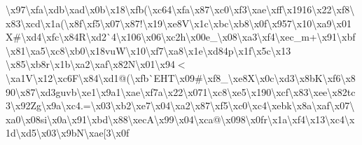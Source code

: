 \begin{DoxyCompactItemize}
\textbackslash{}x97\textbackslash{}xfa\textbackslash{}xdb\textbackslash{}xad\textbackslash{}x0b\textbackslash{}x18\textbackslash{}xfb(\textbackslash{}xc64\textbackslash{}xfa\textbackslash{}x87\textbackslash{}xc0\textbackslash{}xf3\textbackslash{}xae\textbackslash{}xff\textbackslash{}x1916\textbackslash{}x22\textbackslash{}xf8\textbackslash{}x83\textbackslash{}xcd\textbackslash{}x1a(\textbackslash{}x8f\textbackslash{}xf5\textbackslash{}x07\textbackslash{}x87!\textbackslash{}x19\textbackslash{}xe8\+V\textbackslash{}x1c\textbackslash{}xbc\textbackslash{}xb8\textbackslash{}x0f\textbackslash{}x957\textbackslash{}x10\textbackslash{}xa9\textbackslash{}x01\+X\#\textbackslash{}xd4\textbackslash{}xfc\textbackslash{}x84\+R\textbackslash{}xd2\`{}4\textbackslash{}x106\textbackslash{}x06\textbackslash{}xc2h\textbackslash{}x00e\+\_\+\textbackslash{}x08\textbackslash{}xa3\textbackslash{}xf4\textbackslash{}xec\+\_\+m+\textbackslash{}x91\textbackslash{}xbf\textbackslash{}x81\textbackslash{}xa5\textbackslash{}xc8\textbackslash{}xb0\textbackslash{}x18vu\+W\textbackslash{}x10\textbackslash{}xf7\textbackslash{}xa8\textbackslash{}x1e\textbackslash{}xd84p\textbackslash{}x1f\textbackslash{}x5c\textbackslash{}x13 \textbackslash{}x85\textbackslash{}xb8r\textbackslash{}x1b\textbackslash{}xa2\textbackslash{}xaf\textbackslash{}x82\+N\textbackslash{}x01\textbackslash{}x94$<$\textbackslash{}xa1\+V\textbackslash{}x12\textbackslash{}xc6\+F\textbackslash{}x84\textbackslash{}xd1@(\textbackslash{}xfb\`{}\+E\+H\+T\textbackslash{}x09\#\textbackslash{}xf8\+\_\+\textbackslash{}xe8\+X\textbackslash{}x0c\textbackslash{}xd3\textbackslash{}x8b\+K\textbackslash{}xf6\textbackslash{}x890\textbackslash{}x87\textbackslash{}xd3guvb\textbackslash{}xe1\textbackslash{}x9a1\textbackslash{}xae\textbackslash{}xf7a\textbackslash{}x22\textbackslash{}x071\textbackslash{}xc8\textbackslash{}xe5\textbackslash{}x190\textbackslash{}xcf\textbackslash{}x83\textbackslash{}xee\textbackslash{}x82tc3\textbackslash{}x92\+Zg\textbackslash{}x9a\textbackslash{}xc4.=\textbackslash{}x03\textbackslash{}xb2\textbackslash{}xe7\textbackslash{}x04\textbackslash{}xa2\textbackslash{}x87\textbackslash{}xf5\textbackslash{}xc0\textbackslash{}xc4\textbackslash{}xebk\textbackslash{}x8a\textbackslash{}xaf\textbackslash{}x07\textbackslash{}xa0\textbackslash{}x08si\textbackslash{}x0a\textbackslash{}x91\textbackslash{}xbd\textbackslash{}x88\textbackslash{}xec\+A\textbackslash{}x99\textbackslash{}x04\textbackslash{}xca@\textbackslash{}x098\textbackslash{}x0fr\textbackslash{}x1a\textbackslash{}xf4\textbackslash{}x13\textbackslash{}xc4\textbackslash{}x1d\textbackslash{}xd5\textbackslash{}x03\textbackslash{}x9b\+N\textbackslash{}xae\mbox{[}3\textbackslash{}x0f 
\end{DoxyCompactItemize}
